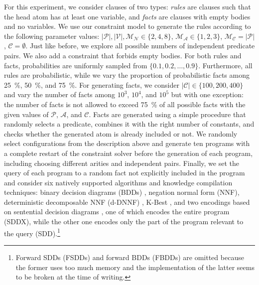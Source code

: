 \documentclass[runningheads]{llncs}
\newcommand{\predicates}{\mathcal{P}}
\newcommand{\variables}{\mathcal{V}}
\newcommand{\constants}{\mathcal{C}}
\newcommand{\arities}{\mathcal{A}}
\newcommand{\maxArity}{\mathcal{M}_{\mathcal{A}}}
\newcommand{\maxNumNodes}{\mathcal{M}_{\mathcal{N}}}
\newcommand{\maxNumClauses}{\mathcal{M}_{\mathcal{C}}}
\begin{document}
For this experiment, we consider clauses of two types: \emph{rules} are clauses
such that the head atom has at least one variable, and \emph{facts} are clauses
with empty bodies and no variables. We use our constraint model to generate the
rules according to the following parameter values: $|\predicates{}|,
|\variables{}|, \maxNumNodes{} \in \{ 2, 4, 8 \}$, $\maxArity{} \in \{ 1, 2, 3
\}$, $\maxNumClauses{} = |\predicates{}|$, $\constants{} = \emptyset$. Just like
before, we explore all possible numbers of independent predicate pairs. We also
add a constraint that forbids empty bodies. For both rules and facts,
probabilities are uniformly sampled from $\{ 0.1, 0.2, \dots, 0.9 \}$.
Furthermore, all rules are probabilistic, while we vary the proportion of
probabilistic facts among \SI{25}{\percent}, \SI{50}{\percent}, and
\SI{75}{\percent}. For generating facts, we consider $|\constants{}| \in \{100,
200, 400 \}$ and vary the number of facts among $10^3$, $10^4$, and $10^5$ but
with one exception: the number of facts is not allowed to exceed
\SI{75}{\percent} of all possible facts with the given values of
$\predicates{}$, $\arities{}$, and $\constants{}$. Facts are generated using a
simple procedure that randomly selects a predicate, combines it with the right
number of constants, and checks whether the generated atom is already included
or not. We randomly select configurations from the description above and
generate ten programs with a complete restart of the constraint solver before
the generation of each program, including choosing different arities and
independent pairs. Finally, we set the query of each program to a random fact
not explicitly included in the program and consider six natively supported
algorithms and knowledge compilation techniques: binary decision diagrams (BDDs)
\cite{DBLP:journals/tc/Bryant86}, negation normal form (NNF), deterministic
decomposable NNF (d-DNNF) \cite{DBLP:journals/jair/DarwicheM02}, K-Best
\cite{DBLP:conf/ijcai/RaedtKT07}, and two encodings based on sentential
decision diagrams \cite{DBLP:conf/ijcai/Darwiche11}, one of which encodes the
entire program (SDDX), while the other one encodes only the part of the program
relevant to the query (SDD).\footnote{Forward SDDs (FSDDs) and forward BDDs
  (FBDDs)
  \cite{DBLP:journals/corr/abs-1911-07750,DBLP:conf/ijcai/VlasselaerBKMR15} are
  omitted because the former uses too much memory and the implementation of the
  latter seems to be broken at the time of writing.}
\end{document}
